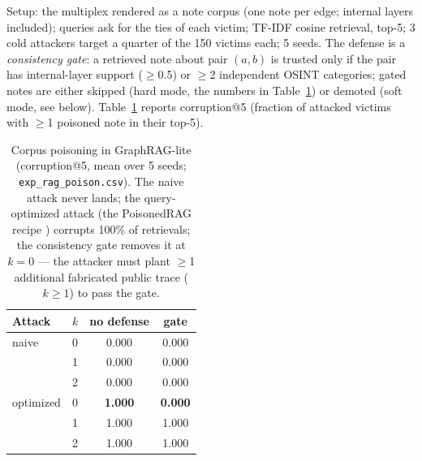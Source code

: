 \documentclass[conference]{IEEEtran}
\begin{document}
Setup: the multiplex rendered as a note corpus (one note per edge; internal
layers included); queries ask for the ties of each victim; TF-IDF cosine
retrieval, top-5; 3 cold attackers target a quarter of the 150 victims each;
5 seeds. The defense is a \emph{consistency gate}: a retrieved note about
pair $(a,b)$ is trusted only if the pair has internal-layer support
($\ge$0.5) or $\ge$2 independent OSINT categories; gated notes are either
skipped (hard mode, the numbers in Table~\ref{tab:rag}) or demoted
(soft mode, see below). Table~\ref{tab:rag} reports
corruption@5 (fraction of attacked victims with $\ge$1 poisoned note in
their top-5).

\begin{table}[t]\centering\footnotesize
\caption{Corpus poisoning in GraphRAG-lite (corruption@5, mean over 5
seeds; \texttt{exp\_rag\_poison.csv}). The naive attack never lands; the
query-optimized attack (the PoisonedRAG recipe \cite{zou2024poisonedrag})
corrupts 100\% of retrievals; the consistency gate removes it at $k{=}0$
--- the attacker must plant $\ge$1 additional fabricated public trace
($k{\ge}1$) to pass the gate.}
\label{tab:rag}
\begin{tabular}{llcc}
\toprule
Attack & $k$ & no defense & gate \\
\midrule
naive      & 0 & 0.000 & 0.000 \\
           & 1 & 0.000 & 0.000 \\
           & 2 & 0.000 & 0.000 \\
\midrule
optimized  & 0 & \textbf{1.000} & \textbf{0.000} \\
           & 1 & 1.000 & 1.000 \\
           & 2 & 1.000 & 1.000 \\
\bottomrule
\end{tabular}
\end{table}
\end{document}

